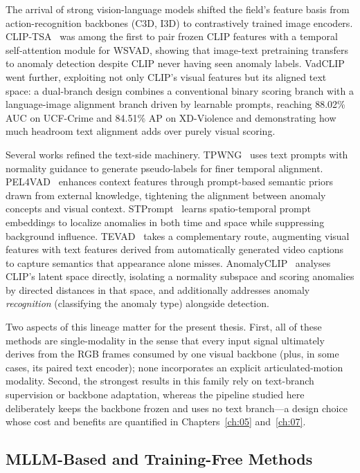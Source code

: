 The arrival of strong vision-language models shifted the field's feature basis from
action-recognition backbones (C3D, I3D) to contrastively trained image encoders.
CLIP-TSA~\cite{joo2023cliptsa} was among the first to pair frozen CLIP features with a temporal
self-attention module for WSVAD, showing that image-text pretraining transfers to anomaly
detection despite CLIP never having seen anomaly labels. VadCLIP~\cite{wu2024vadclip} went
further, exploiting not only CLIP's visual features but its aligned text space: a dual-branch
design combines a conventional binary scoring branch with a language-image alignment branch driven
by learnable prompts, reaching 88.02\% AUC on UCF-Crime and 84.51\% AP on XD-Violence and
demonstrating how much headroom text alignment adds over purely visual scoring.

Several works refined the text-side machinery. TPWNG~\cite{yang2024tpwng} uses text prompts with
normality guidance to generate pseudo-labels for finer temporal alignment.
PEL4VAD~\cite{pu2024pel4vad} enhances context features through prompt-based semantic priors drawn
from external knowledge, tightening the alignment between anomaly concepts and visual context.
STPrompt~\cite{wu2024stprompt} learns spatio-temporal prompt embeddings to localize anomalies in
both time and space while suppressing background influence. TEVAD~\cite{chen2023tevad} takes a
complementary route, augmenting visual features with text features derived from automatically
generated video captions to capture semantics that appearance alone misses.
AnomalyCLIP~\cite{zanella2024anomalyclip} analyses CLIP's latent space directly, isolating a
normality subspace and scoring anomalies by directed distances in that space, and additionally
addresses anomaly \emph{recognition} (classifying the anomaly type) alongside detection.

Two aspects of this lineage matter for the present thesis. First, all of these methods are
single-modality in the sense that every input signal ultimately derives from the RGB frames
consumed by one visual backbone (plus, in some cases, its paired text encoder); none incorporates
an explicit articulated-motion modality. Second, the strongest results in this family rely on
text-branch supervision or backbone adaptation, whereas the pipeline studied here deliberately
keeps the backbone frozen and uses no text branch---a design choice whose cost and benefits are
quantified in Chapters~\ref{ch:05} and~\ref{ch:07}.

\subsection{MLLM-Based and Training-Free Methods}

